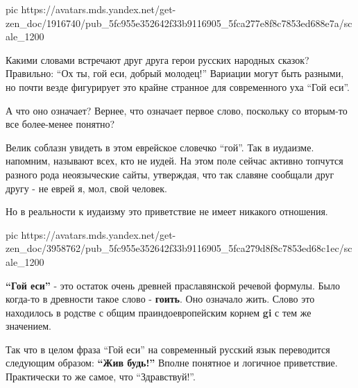 \ifcmt
  pic https://avatars.mds.yandex.net/get-zen_doc/1916740/pub_5fc955e352642f33b9116905_5fca277e8f8c7853ed688e7a/scale_1200
\fi

Какими словами встречают друг друга герои русских народных сказок? Правильно:
\enquote{Ох ты, гой еси, добрый молодец!} Вариации могут быть разными, но почти везде
фигурирует это крайне странное для современного уха \enquote{Гой еси}.

А что оно означает? Вернее, что означает первое слово, поскольку со вторым-то
все более-менее понятно?

Велик соблазн увидеть в этом еврейское словечко \enquote{гой}. Так в иудаизме.
напомним, называют всех, кто не иудей. На этом поле сейчас активно топчутся
разного рода неоязыческие сайты, утверждая, что так славяне сообщали друг другу
- не еврей я, мол, свой человек.

Но в реальности к иудаизму это приветствие не имеет никакого отношения.


\ifcmt
  pic https://avatars.mds.yandex.net/get-zen_doc/3958762/pub_5fc955e352642f33b9116905_5fca279d8f8c7853ed68c1ec/scale_1200
\fi

\textbf{\enquote{Гой еси}} - это остаток очень древней праславянской речевой формулы. Было
когда-то в древности такое слово - \textbf{гоить}. Оно означало жить. Слово это
находилось в родстве с общим праиндоевропейским корнем \textbf{gi} с тем же значением.

Так что в целом фраза \enquote{Гой еси} на современный русский язык переводится
следующим образом: \textbf{\enquote{Жив будь!}} Вполне понятное и логичное приветствие.
Практически то же самое, что \enquote{Здравствуй!}.

